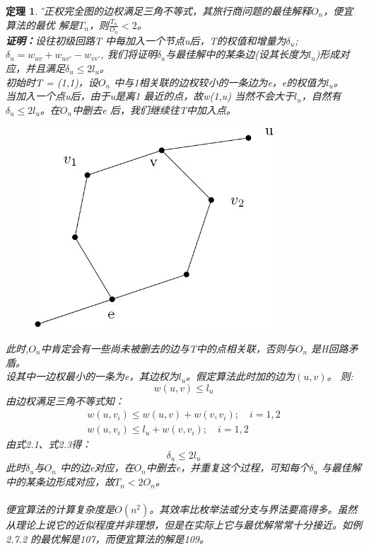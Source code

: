\documentclass[11pt,a4paper,openany]{book}
\newtheorem{theorem}{\textbf{定理}}[section]
\begin{document}
\begin{theorem}\H
设正权完全图的边权满足三角不等式，其旅行商问题的最佳解释$O_n$，便宜算法的最优
解是$T_n$，则$\frac{T_n}{O_n} < 2$。\\
\textbf{证明：}设往初级回路T 中每加入一个节点u后，T的权值和增量为$\delta_u$; $\delta_u=w_{uv} +w_{uv'} −w_{vv'}$,
我们将证明$\delta_u$与最佳解中的某条边(设其长度为$l_u$)形成对应，并且满足$\delta_u\leq2l_u$。\\
\indent 初始时T = {(1,1)}，设$O_n$ 中与1相关联的边权较小的一条边为e，e的权值为$l_u$。\\
当加入一个点u后，由于u是离1 最近的点，故w(1,u) 当然不会大于$l_u$，自然有$\delta_u\leq2l_u$。在$O_n$中删去e 后，我们继续往T中加入点。\\
\begin{figure}[H]
  \centering
  \includegraphics[width=0.8\textwidth]{2.20.png}
  \caption{}
\end{figure}
\indent 此时,$O_n$中肯定会有一些尚未被删去的边与T中的点相关联，否则与$O_n$ 是H回路矛盾。\\
设其中一边权最小的一条为e，其边权为$l_u$。假定算法此时加的边为$(u,v)$。 则:
\begin{equation}
  w(u,v)\leq l_u
\end{equation}
由边权满足三角不等式知：\\
\begin{gather}
  w(u,v_i)\leq w(u,v) + w(v,v_i); \quad i = 1, 2\\
  w(u,v_i) \leq l_u + w(v,v_i); \quad i = 1,2
\end{gather}
由式2.1、式2.3得：
\begin{equation}
  \delta_u \leq 2l_u
\end{equation}
\indent 此时$\delta_u $与$O_n$ 中的边e对应，在$O_n$中删去e，并重复这个过程，可知每个$\delta_u$ 与最佳解
中的某条边形成对应，故$T_n < 2O_n$。
\paragraph{}便宜算法的计算复杂度是$O(n^2)$。其效率比枚举法或分支与界法要高得多。虽然从理论上说它的近似程度并非理想，但是在实际上它与最优解常常十分接近。如例2.7.2 的最优解是107，而便宜算法的解是109。
\end{theorem}
\end{document}
